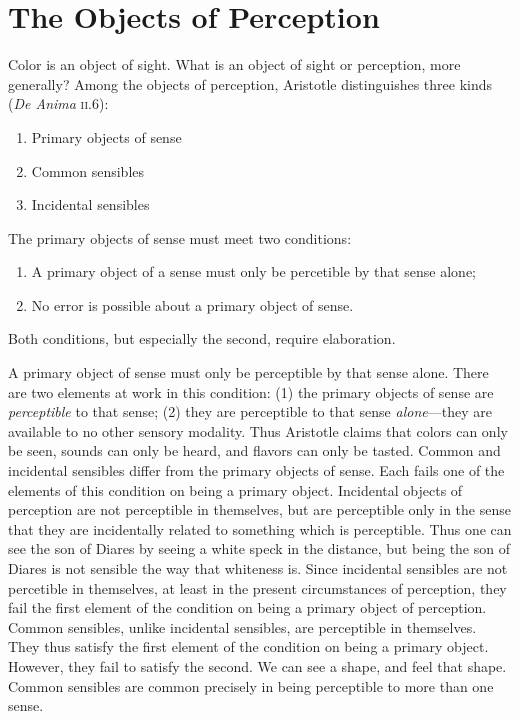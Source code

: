 \section{The Objects of Perception} %
\label{sec:the_objects_of_perception}

Color is an object of sight. What is an object of sight or perception, more generally? Among the objects of perception, Aristotle distinguishes three kinds (\emph{De Anima} \textsc{ii}.6):
\begin{enumerate}[(1)]
	\item Primary objects of sense
	\item Common sensibles
	\item Incidental sensibles
\end{enumerate}

The primary objects of sense must meet two conditions: 
\begin{enumerate}[(1)]
	\item A primary object of a sense must only be percetible by that sense alone;
	\item No error is possible about a primary object of sense.
\end{enumerate}
Both conditions, but especially the second, require elaboration.

A primary object of sense must only be perceptible by that sense alone. There are two elements at work in this condition: (1) the primary objects of sense are \emph{perceptible} to that sense; (2) they are perceptible to that sense \emph{alone}---they are available to no other sensory modality. Thus Aristotle claims that colors can only be seen, sounds can only be heard, and flavors can only be tasted. Common and incidental sensibles differ from the primary objects of sense. Each fails one of the elements of this condition on being a primary object. Incidental objects of perception are not perceptible in themselves, but are perceptible only in the sense that they are incidentally related to something which is perceptible. Thus one can see the son of Diares by seeing a white speck in the distance, but being the son of Diares is not sensible the way that whiteness is. Since incidental sensibles are not percetible in themselves, at least in the present circumstances of perception, they fail the first element of the condition on being a primary object of perception. Common sensibles, unlike incidental sensibles, are perceptible in themselves. They thus satisfy the first element of the condition on being a primary object. However, they fail to satisfy the second. We can see a shape, and feel that shape. Common sensibles are common precisely in being perceptible to more than one sense.

